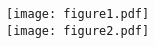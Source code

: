 \documentclass[varwidth, border=0pt]{standalone}
\begin{document}
\noindent
\texttt{[image: figure1.pdf]}\\
\texttt{[image: figure2.pdf]}
\end{document}
